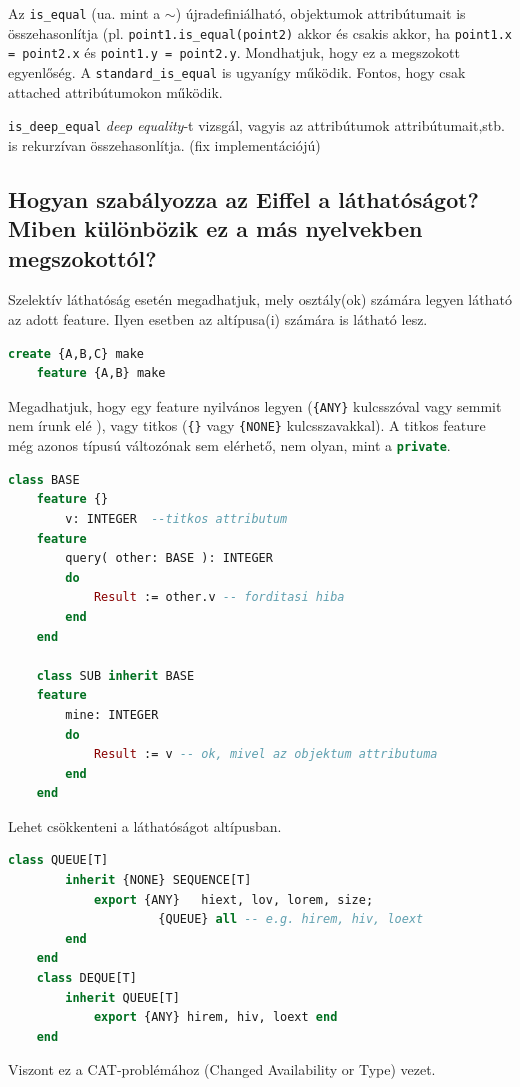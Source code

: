 	Az \lstinline[language=Eiffel]|is_equal| (ua. mint a $\sim$) újradefiniálható, objektumok attribútumait is összehasonlítja (pl. \lstinline[language=Eiffel]|point1.is_equal(point2)| akkor és csakis akkor, ha \lstinline[language=Eiffel]|point1.x = point2.x| és \lstinline[language=Eiffel]|point1.y = point2.y|. Mondhatjuk, hogy ez a megszokott egyenlőség. A  \lstinline[language=Eiffel]|standard_is_equal| is ugyanígy működik. Fontos, hogy csak attached attribútumokon működik.
	
	\lstinline[language=Eiffel]|is_deep_equal| \textit{deep equality}-t vizsgál, vagyis az attribútumok attribútumait,stb. is rekurzívan összehasonlítja. (fix implementációjú)
	
\subsection{ Hogyan szabályozza az Eiffel a láthatóságot? Miben különbözik ez a más nyelvekben megszokottól? }
	Szelektív láthatóság esetén megadhatjuk, mely osztály(ok) számára legyen látható az adott feature. Ilyen esetben az altípusa(i) számára is látható lesz.
	\begin{lstlisting}[language=Eiffel]
	create {A,B,C} make
	feature {A,B} make
	\end{lstlisting}
	
	Megadhatjuk, hogy egy feature nyilvános legyen (\lstinline[language=Eiffel]|{ANY}| kulcsszóval vagy semmit nem írunk elé ), vagy titkos (\lstinline[language=Eiffel]|{}| vagy \lstinline[language=Eiffel]|{NONE}| kulcsszavakkal). A titkos feature még azonos típusú változónak sem elérhető, nem olyan, mint a \lstinline[language=C++]|private|.
	\begin{lstlisting}[language=Eiffel]
	class BASE
	feature {}
		v: INTEGER  --titkos attributum
	feature
		query( other: BASE ): INTEGER
		do
			Result := other.v -- forditasi hiba
		end
	end
	
	class SUB inherit BASE
	feature
		mine: INTEGER
		do
			Result := v -- ok, mivel az objektum attributuma
		end
	end
	\end{lstlisting}

	Lehet csökkenteni a láthatóságot altípusban.
	\begin{lstlisting}[language=Eiffel]
	class QUEUE[T]
		inherit {NONE} SEQUENCE[T]
			export {ANY}   hiext, lov, lorem, size;
				   	 {QUEUE} all -- e.g. hirem, hiv, loext
		end
	end
	class DEQUE[T]
		inherit QUEUE[T]
			export {ANY} hirem, hiv, loext end
	end
	\end{lstlisting}
	Viszont ez a CAT-problémához (Changed Availability or Type) vezet.
	
